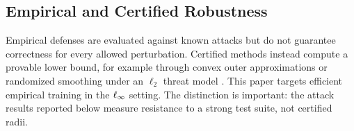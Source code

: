 \subsection{Empirical and Certified Robustness}
Empirical defenses are evaluated against known attacks but do not guarantee
correctness for every allowed perturbation. Certified methods instead compute a
provable lower bound, for example through convex outer approximations
\cite{wong2018provable} or randomized smoothing under an $\ell_2$ threat model
\cite{cohen2019certified}. This paper targets efficient empirical training in
the $\ell_\infty$ setting. The distinction is important: the attack results reported
below measure resistance to a strong test suite, not certified radii.
